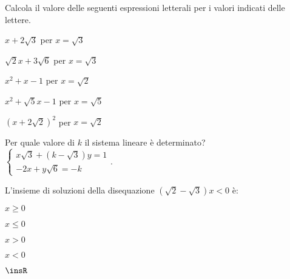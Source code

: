 \begin{esercizio}%
Calcola il valore delle seguenti espressioni letterali per i valori indicati 
delle lettere.
\begin{multicols}{3}
\begin{enumeratea}
\item $x+2\sqrt 3$ per $x=\sqrt 3$
\item $\sqrt 2x+3\sqrt 6$ per $x=\sqrt{3}$
\item $x^2+x-1$ per $x=\sqrt 2$
\item $x^2+\sqrt 5x-1$ per $x=\sqrt 5$
\item $(x+2\sqrt 2)^2$ per $x=\sqrt 2$
\end{enumeratea}
\end{multicols}
\end{esercizio}



\begin{esercizio}%
Per quale valore di $k$ il sistema lineare è determinato?
$\left\{\begin{array}{l}{x\sqrt 3+(k-\sqrt 3)y=1}\\
 {-2x+y\sqrt 6=-k} \end{array}\right..$
\end{esercizio}

\begin{esercizio}%
L'insieme di soluzioni della disequazione $(\sqrt 2-\sqrt 3)x<0$ è:
\begin{multicols}{5}
 \begin{enumeratea}
 \item $x\ge 0$
 \item $x\le 0$
 \item $x>0$
 \item $x<0$
 \item $\insR$
 \end{enumeratea}
\end{multicols}
\end{esercizio}

